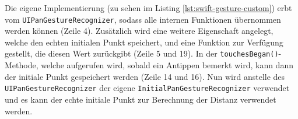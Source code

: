 Die eigene Implementierung (zu sehen im Listing \ref{lst:swift-gesture-custom}) erbt vom \texttt{UIPanGestureRecognizer}, sodass alle internen Funktionen übernommen werden können (Zeile 4).
Zusätzlich wird eine weitere Eigenschaft angelegt, welche den echten initialen Punkt speichert, und eine Funktion zur Verfügung gestellt, die diesen Wert zurückgibt (Zeile 5 und 19).
In der \texttt{touchesBegan()}-Methode, welche aufgerufen wird, sobald ein Antippen bemerkt wird, kann dann der initiale Punkt gespeichert werden (Zeile 14 und 16).
Nun wird anstelle des \texttt{UIPanGestureRecognizer} der eigene \texttt{InitialPanGestureRecognizer} verwendet und es kann der echte initiale Punkt zur Berechnung der Distanz verwendet werden.

